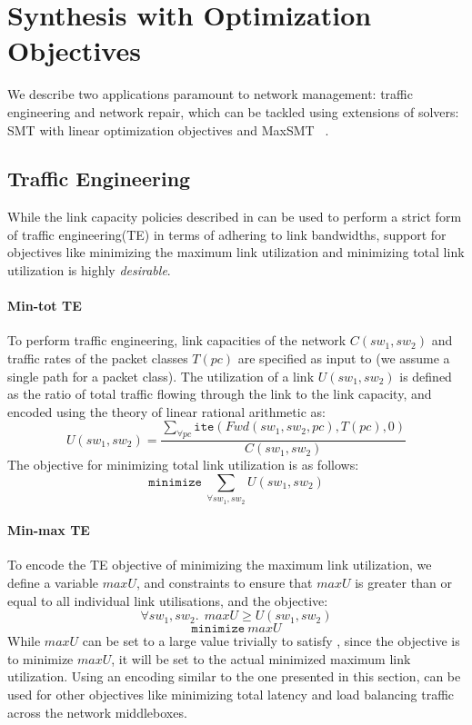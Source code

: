 \section{Synthesis with Optimization Objectives}
We describe two applications paramount to network management:
traffic engineering and network repair, which can be tackled using
extensions of solvers: SMT with linear optimization objectives and MaxSMT ~\cite{maxsmt}.
\subsection{Traffic Engineering}
While the link capacity policies described in  can
be used to perform a strict form of traffic engineering(TE) in terms of 
adhering to link bandwidths, support for objectives
like minimizing the maximum link utilization and minimizing total link utilization
is highly \emph{desirable}.

\paragraph{Min-tot TE}
To perform traffic engineering, link capacities of the network $C(sw_1, sw_2)$ and traffic 
rates of the packet classes $T(pc)$ are specified as input to \name (we assume a single
path for a packet class). The utilization 
of a link $U(sw_1, sw_2)$ is defined as the ratio of total traffic flowing through the link to the 
link capacity, and encoded using the theory of linear rational arithmetic as:
\begin{equation}
U(sw_1, sw_2) = \frac{\sum_{\forall pc} \texttt{ite}(Fwd(sw_1,sw_2, pc), T(pc), 0)} {C(sw_1, sw_2)}
\end{equation}
The objective for minimizing total link utilization is as follows:
\begin{equation}
	\texttt{minimize}\ \sum_{\forall sw_1, sw_2} U(sw_1, sw_2)
\end{equation}
\paragraph{Min-max TE}
To encode the TE objective of minimizing the maximum link utilization, we define
a variable $maxU$, and constraints to ensure that $maxU$ is greater than or equal to all 
individual link utilisations, and the objective: 
\begin{equation} \label{eq:maxu}
\forall sw_1, sw_2.\ \ maxU \geq U(sw_1, sw_2)
\end{equation} 
\begin{equation}
		\texttt{minimize}\ maxU
\end{equation}
While $maxU$ can be set to a large value trivially to satisfy 
, since the objective is to minimize $maxU$, it will be set to the actual
minimized maximum link utilization. Using an encoding similar to the one presented in this section, \name can be used for other objectives like minimizing total latency and load balancing
traffic across the network middleboxes.

